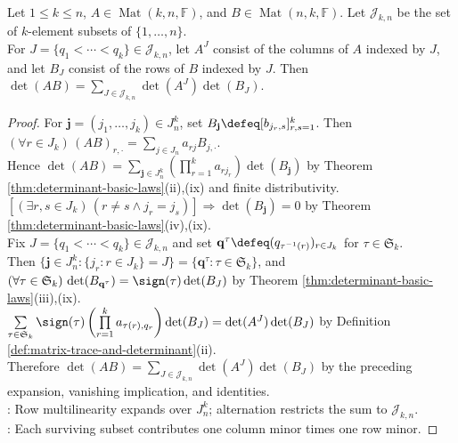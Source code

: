 \begin{theorem} \label{thm:cauchy-binet-minors} \\
Let $1\leq k\leq n$, $A\in\operatorname{Mat}(k,n,\mathbb{F})$, and $B\in\operatorname{Mat}(n,k,\mathbb{F})$. Let $\mathcal{J}_{k,n}$ be the set of $k$-element subsets of $\{1,\ldots,n\}$.\\
For $J=\{q_1<\cdots<q_k\}\in\mathcal{J}_{k,n}$, let $A^J$ consist of the columns of $A$ indexed by $J$, and let $B_J$ consist of the rows of $B$ indexed by $J$. Then $\det(AB)=\sum\limits_{J\in\mathcal{J}_{k,n}}\det(A^J)\det(B_J)$.
\begin{proof}
For $\mathbf{j}=(j_1,\ldots,j_k)\in J_n^k$, set $B_{\mathbf{j}}\defeq[b_{j_r,s}]_{r,s=1}^{k}$. Then $(\forall r\in J_k)\,(AB)_{r,\cdot}=\sum\limits_{j\in J_n}a_{rj}B_{j,\cdot}$.\\
Hence $\det(AB)=\sum\limits_{\mathbf{j}\in J_n^k}\left(\prod\limits_{r=1}^{k}a_{rj_r}\right)\det(B_{\mathbf{j}})$ by Theorem \ref{thm:determinant-basic-laws}(ii),(ix) and finite distributivity.\\
$[(\exists r,s\in J_k)\,(r\neq s\land j_r=j_s)]\Rightarrow\det(B_{\mathbf{j}})=0$ by Theorem \ref{thm:determinant-basic-laws}(iv),(ix).\\
Fix $J=\{q_1<\cdots<q_k\}\in\mathcal{J}_{k,n}$ and set $\mathbf{q}^{\tau}\defeq(q_{\tau^{-1}(r)})_{r\in J_k}$ for $\tau\in\mathfrak{S}_k$.\\
Then $\{\mathbf{j}\in J_n^k:\{j_r:r\in J_k\}=J\}=\{\mathbf{q}^{\tau}:\tau\in\mathfrak{S}_k\}$, and $(\forall\tau\in\mathfrak{S}_k)\,\det(B_{\mathbf{q}^{\tau}})=\sign(\tau)\det(B_J)$ by Theorem \ref{thm:determinant-basic-laws}(iii),(ix).\\
$\sum\limits_{\tau\in\mathfrak{S}_k}\sign(\tau)\left(\prod\limits_{r=1}^{k}a_{\tau(r),q_r}\right)\det(B_J)=\det(A^J)\det(B_J)$ by Definition \ref{def:matrix-trace-and-determinant}(ii).\\
Therefore $\det(AB)=\sum\limits_{J\in\mathcal{J}_{k,n}}\det(A^J)\det(B_J)$ by the preceding expansion, vanishing implication, and identities.\\
: Row multilinearity expands over $J_n^k$; alternation restricts the sum to $\mathcal{J}_{k,n}$.\\
: Each surviving subset contributes one column minor times one row minor.
\end{proof}
\end{theorem}

